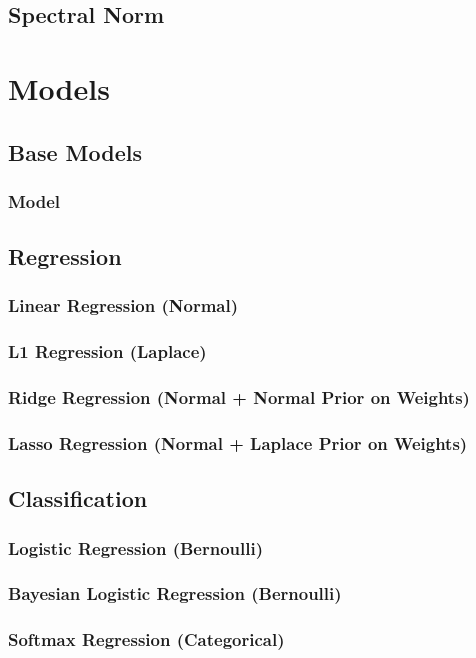 \documentclass{article}
\begin{document}
\subsection{Spectral Norm}


\section{Models}
\subsection{Base Models}
\subsubsection{Model}

\subsection{Regression}
\subsubsection{Linear Regression (Normal)}
\subsubsection{L1 Regression (Laplace)}
\subsubsection{Ridge Regression (Normal + Normal Prior on Weights)}
\subsubsection{Lasso Regression (Normal + Laplace Prior on Weights)}

\subsection{Classification}
\subsubsection{Logistic Regression (Bernoulli)}
\subsubsection{Bayesian Logistic Regression (Bernoulli)}
\subsubsection{Softmax Regression (Categorical)}
\end{document}
